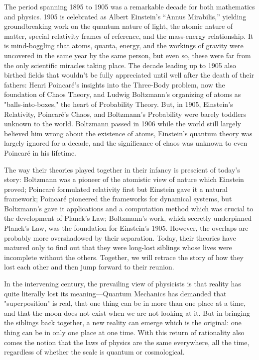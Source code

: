 \documentclass{article}
\begin{document}
The period spanning 1895 to 1905 was a remarkable decade for both mathematics and physics. 1905 is celebrated as Albert Einstein’s “Annus Mirabilis,” yielding groundbreaking work on the quantum nature of light\cite{EinsteinHeuristic}, the atomic nature of matter\cite{EinsteinBrownian}, special relativity frames of reference\cite{EinsteinRelativity}, and the mass-energy relationship\cite{EinsteinMassEnergy}. It is mind-boggling that atoms, quanta, energy, and the workings of gravity were uncovered in the same year by the same person, but even so, these were far from the only scientific miracles taking place. The decade leading up to 1905 also birthed fields that wouldn't be fully appreciated until well after the death of their fathers: Henri Poincar\'e's insights into the Three-Body problem, now the foundation of Chaos Theory, and Ludwig Boltzmann's organizing of atoms as "balls-into-boxes," the heart of Probability Theory. But, in 1905, Einstein's Relativity, Poincar\'e's Chaos, and Boltzmann's Probability were barely toddlers unknown to the world. Boltzmann passed in 1906 while the world still largely believed him wrong about the existence of atoms, Einstein's quantum theory was largely ignored for a decade, and the significance of chaos was unknown to even Poincar\'e in his lifetime.

The way their theories played together in their infancy is prescient of today's story: Boltzmann was a pioneer of the atomistic view of nature which Einstein proved; Poincar\'e formulated relativity first but Einstein gave it a natural framework; Poincar\'e pioneered the frameworks for dynamical systems, but Boltzmann's gave it applications and a computation method which was crucial to the development of Planck's Law; Boltzmann's work, which secretly underpinned Planck's Law, was the foundation for Einstein's 1905. However, the overlaps are probably more overshadowed by their separation. Today, their theories have matured only to find out that they were long-lost siblings whose lives were incomplete without the others. Together, we will retrace the story of how they lost each other and then jump forward to their reunion.

In the intervening century, the prevailing view of physicists is that reality has quite literally lost its meaning—Quantum Mechanics has demanded that "superposition" is real, that one thing can be in more than one place at a time, and that the moon does not exist when we are not looking at it. But in bringing the siblings back together, a new reality can emerge which is the original: one thing can be in only one place at one time. With this return of rationality also comes the notion that the laws of physics are the same everywhere, all the time, regardless of whether the scale is quantum or cosmological.
\end{document}
